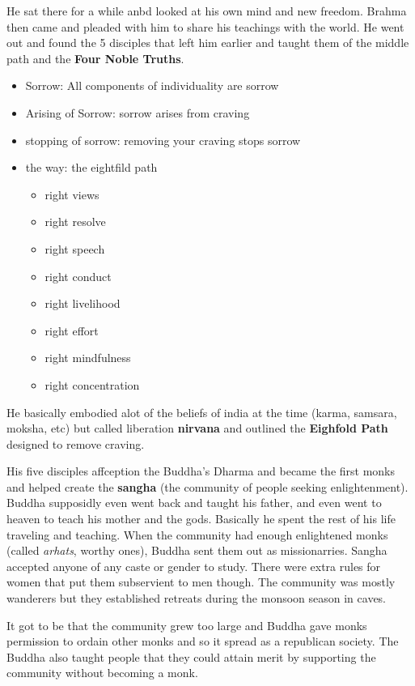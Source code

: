 \documentclass{article}
\begin{document}
He sat there for a while anbd looked at his own mind and new freedom. Brahma then came and pleaded with him to share his teachings with the world. He went out and found the 5 disciples that left him earlier and taught them of the middle path and the \textbf{Four Noble Truths}.
\begin{itemize}
	\item Sorrow: All components of individuality are sorrow
	\item Arising of Sorrow: sorrow arises from craving
	\item stopping of sorrow: removing your craving stops sorrow
	\item the way: the eightfild path
	\begin{itemize}
		\item right views
		\item right resolve
		\item right speech
		\item right conduct
		\item right livelihood
		\item right effort
		\item right mindfulness
		\item right concentration
	\end{itemize}
\end{itemize}

He basically embodied alot of the beliefs of india at the time (karma, samsara, moksha, etc) but called liberation \textbf{nirvana} and outlined the \textbf{Eighfold Path} designed to remove craving.

His five disciples affception the Buddha's Dharma and became the first monks and helped create the \textbf{sangha} (the community of people seeking enlightenment). Buddha supposidly even went back and taught his father, and even went to heaven to teach his mother and the gods. Basically he spent the rest of his life traveling and teaching. When the community had enough enlightened monks (called \emph{arhats}, worthy ones), Buddha sent them out as missionarries. Sangha accepted anyone of any caste or gender to study. There were extra rules for women that put them subservient to men though. The community was mostly wanderers but they established retreats during the monsoon season in caves.

It got to be that the community grew too large and Buddha gave monks permission to ordain other monks and so it spread as a republican society. The Buddha also taught people that they could attain merit by supporting the community without becoming a monk.
\end{document}
